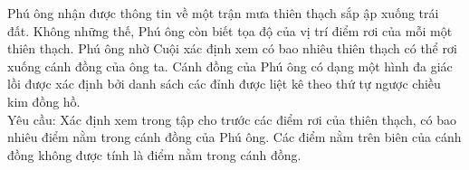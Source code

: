 Phú ông nhận được thông tin về một trận mưa thiên thạch sắp ập xuống trái đất. Không những thế, Phú ông còn biết tọa độ của vị trí điểm rơi của mỗi một thiên thạch. Phú ông nhờ Cuội xác định xem có bao nhiêu thiên thạch có thể rơi xuống cánh đồng của ông ta. Cánh đồng của Phú ông có dạng một hình đa giác lồi được xác định bởi danh sách các đỉnh được liệt kê theo thứ tự ngược chiều kim đồng hồ.   
\\       Yêu cầu:      Xác định xem trong tập cho trước các điểm rơi của thiên thạch, có bao nhiêu điểm nằm trong cánh đồng của Phú ông. Các điểm nằm trên biên của cánh đồng không được tính là điểm nằm trong cánh đồng.
